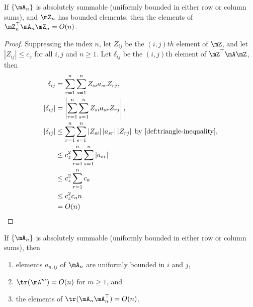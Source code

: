 \documentclass[english,12pt]{book}\usepackage[]{graphicx}\usepackage[]{xcolor}
\begin{document}
\begin{lemma}\label{lemma:bounde_ON}
If $\left\lbrace \mA_n \right\rbrace$ is absolutely summable (uniformly bounded in either row or column sums), and $\mZ_n$ has bounded elements, then the elements of $\mZ_n^\top \mA_n\mZ_n = O(n)$.
\end{lemma}

\begin{proof}
  Suppressing the index $n$, let $Z_{ij}$ be the $(i,j)th$ element of $\mZ$, and let $\left|Z_{ij}\right|\leq c_z$ for all $i,j$ and $n\geq 1$. Let $\delta_{ij}$ be the $(i,j)$th element of $\mZ^\top \mA\mZ$, then
  \begin{equation*}
    \begin{aligned}
      \delta_{ij} & = \sum_{r = 1}^n\sum_{s = 1}^n Z_{si}a_{sr}Z_{rj},  \\
      \left|\delta_{ij}\right| & = \left|\sum_{r = 1}^n\sum_{s = 1}^n Z_{si}a_{sr}Z_{rj}\right|, \\
      \left|\delta_{ij}\right| & \leq \sum_{r = 1}^n\sum_{s = 1}^n \left|Z_{si}\right| \left|a_{sr}\right|\left|Z_{rj}\right| \; \mbox{by \ref{def:triangle-inequality}}, \\
       & \leq c_z^2\sum_{r = 1}^n\sum_{s = 1}^n  \left|a_{sr}\right| \\
        & \leq c_z^2\sum_{r = 1}^n c_a \\
        & \leq c_z^2c_an \\
        & = O(n)
    \end{aligned}
  \end{equation*}
\end{proof}

\begin{lemma}\label{lemma:bounde_trace}
If $\left\lbrace \mA_n \right\rbrace$ is absolutely summable (uniformly bounded in either row or column sums), then
\begin{enumerate}
 \item elements $a_{n,ij}$ of $\mA_n$ are uniformly bounded in $i$ and $j$,
 \item $\tr(\mA^m) = O(n)$ for $m\geq 1$, and 
 \item the elements of $\tr(\mA_n\mA_n^\top)= O(n)$.
\end{enumerate}
\end{lemma}
\end{document}
